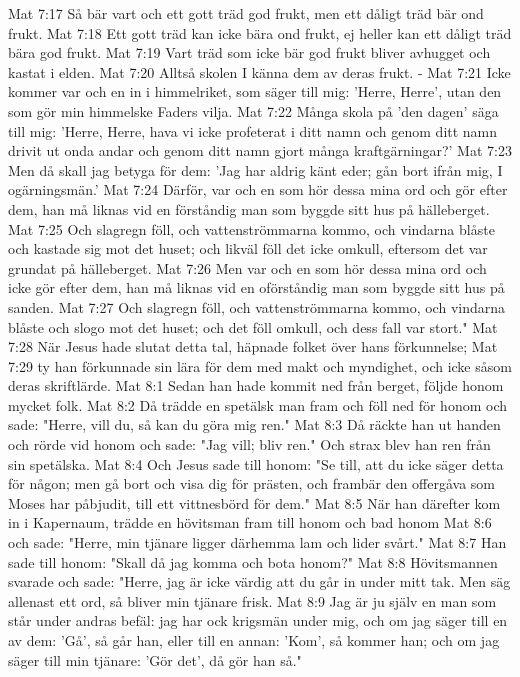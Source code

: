 Mat 7:17  Så bär vart och ett gott träd god frukt, men ett dåligt träd bär ond frukt.
Mat 7:18  Ett gott träd kan icke bära ond frukt, ej heller kan ett dåligt träd bära god frukt.
Mat 7:19  Vart träd som icke bär god frukt bliver avhugget och kastat i elden.
Mat 7:20  Alltså skolen I känna dem av deras frukt. -
Mat 7:21  Icke kommer var och en in i himmelriket, som säger till mig: 'Herre, Herre', utan den som gör min himmelske Faders vilja.
Mat 7:22  Många skola på 'den dagen' säga till mig: 'Herre, Herre, hava vi icke profeterat i ditt namn och genom ditt namn drivit ut onda andar och genom ditt namn gjort många kraftgärningar?'
Mat 7:23  Men då skall jag betyga för dem: 'Jag har aldrig känt eder; gån bort ifrån mig, I ogärningsmän.'
Mat 7:24  Därför, var och en som hör dessa mina ord och gör efter dem, han må liknas vid en förståndig man som byggde sitt hus på hälleberget.
Mat 7:25  Och slagregn föll, och vattenströmmarna kommo, och vindarna blåste och kastade sig mot det huset; och likväl föll det icke omkull, eftersom det var grundat på hälleberget.
Mat 7:26  Men var och en som hör dessa mina ord och icke gör efter dem, han må liknas vid en oförståndig man som byggde sitt hus på sanden.
Mat 7:27  Och slagregn föll, och vattenströmmarna kommo, och vindarna blåste och slogo mot det huset; och det föll omkull, och dess fall var stort."
Mat 7:28  När Jesus hade slutat detta tal, häpnade folket över hans förkunnelse;
Mat 7:29  ty han förkunnade sin lära för dem med makt och myndighet, och icke såsom deras skriftlärde.
Mat 8:1  Sedan han hade kommit ned från berget, följde honom mycket folk.
Mat 8:2  Då trädde en spetälsk man fram och föll ned för honom och sade: "Herre, vill du, så kan du göra mig ren."
Mat 8:3  Då räckte han ut handen och rörde vid honom och sade: "Jag vill; bliv ren." Och strax blev han ren från sin spetälska.
Mat 8:4  Och Jesus sade till honom: "Se till, att du icke säger detta för någon; men gå bort och visa dig för prästen, och frambär den offergåva som Moses har påbjudit, till ett vittnesbörd för dem."
Mat 8:5  När han därefter kom in i Kapernaum, trädde en hövitsman fram till honom och bad honom
Mat 8:6  och sade: "Herre, min tjänare ligger därhemma lam och lider svårt."
Mat 8:7  Han sade till honom: "Skall då jag komma och bota honom?"
Mat 8:8  Hövitsmannen svarade och sade: "Herre, jag är icke värdig att du går in under mitt tak. Men säg allenast ett ord, så bliver min tjänare frisk.
Mat 8:9  Jag är ju själv en man som står under andras befäl: jag har ock krigsmän under mig, och om jag säger till en av dem: 'Gå', så går han, eller till en annan: 'Kom', så kommer han; och om jag säger till min tjänare: 'Gör det', då gör han så."
